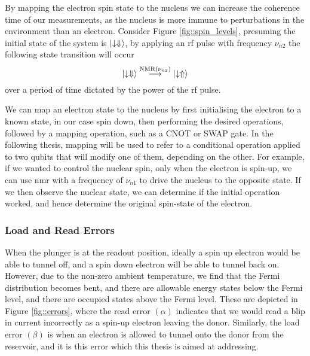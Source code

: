 		By mapping the electron spin state to the nucleus we can increase the coherence time of our measurements, as the nucleus is more immune to perturbations in the environment than an electron. Consider Figure \ref{fig::spin_levels}, presuming the initial state of the system is $\ket{\downarrow \Downarrow}$, by applying an \gls{rf} pulse with frequency $\nu_{n2}$ the following state transition will occur 
		$$\ket{\downarrow \Downarrow} \overset{\textrm{NMR($\nu_{n2}$)}}{\longrightarrow }\ket{\downarrow \Uparrow}$$
		over a period of time dictated by the power of the \gls{rf} pulse.
		
		We can map an electron state to the nucleus by first initialising the electron to a known state, in our case spin down, then performing the desired operations, followed by a mapping operation, such as a CNOT or SWAP gate. In the following thesis, mapping will be used to refer to a conditional operation applied to two qubits that will modify one of them, depending on the other. For example, if we wanted to control the nuclear spin, only when the electron is spin-up, we can use \gls{nmr} with a frequency of $\nu_{n1}$ to drive the nucleus to the opposite state. If we then observe the nuclear state, we can determine if the initial operation worked, and hence determine the original spin-state of the electron.
		
	\subsubsection{Load and Read Errors}
		\label{sec::load_error}
		When the plunger is at the readout position, ideally a spin up electron would be able to tunnel off, and a spin down electron will be able to tunnel back on. However, due to the non-zero ambient temperature, we find that the Fermi distribution becomes bent, and there are allowable energy states below the Fermi level, and there are occupied states above the Fermi level. These are depicted in Figure \ref{fig::errors}, where the read error $(\alpha)$ indicates that we would read a blip in current incorrectly as a spin-up electron leaving the donor. Similarly, the load error $(\beta)$ is when an electron is allowed to tunnel onto the donor from the reservoir, and it is this error which this thesis is aimed at addressing. 
		

